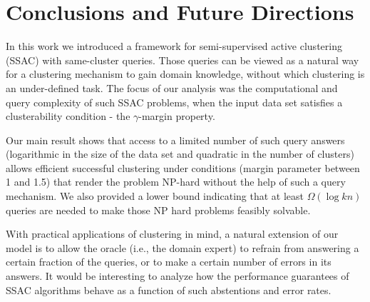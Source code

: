 \documentclass{article}
\begin{document}
\section{Conclusions and Future Directions}
In this work we introduced a framework for semi-supervised active clustering (SSAC) with same-cluster queries. Those queries can be viewed as a natural way for a clustering mechanism to gain domain knowledge, without which clustering is an under-defined task. The focus of our analysis was the computational and query complexity of %
such SSAC problems, when the input data set satisfies a clusterability condition - the $\gamma$-margin property.

Our main result shows that access to a limited number of such query answers (logarithmic in the size of the data set and quadratic in the number of clusters) allows efficient successful clustering under conditions (margin parameter between 1 and 1.5) that render the problem NP-hard without the help of such a query mechanism.  
 We also provided a lower bound indicating that at least $\Omega(\log kn)$ queries are needed to make those NP hard problems feasibly solvable.

With practical applications of clustering in mind, a natural extension of our model is to allow the oracle (i.e., the domain expert) to refrain from answering a certain fraction of the queries, or to make a certain number of errors in its answers. It would be interesting to analyze how the performance guarantees of SSAC algorithms behave as a function of such abstentions and error rates.



\end{document}
